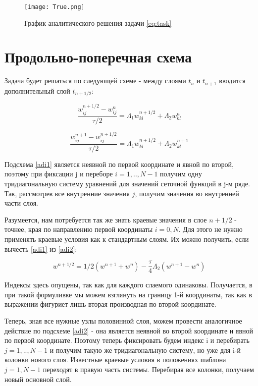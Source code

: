 \begin{figure}[h]
\centering
\texttt{[image: True.png]}
\caption{График аналитического решения задачи \ref{eq:task}}
\end{figure}

\newpage
\section{Продольно-поперечная схема}

Задача будет решаться по следующей схеме - между слоями $t_n$ и $t_{n+1}$  вводится дополнительный слой $t_{n+1/2}$:

\begin{equation}
\frac{w_{ij}^{n+1/2} - w_{ij}^n}{\tau / 2} = \Lambda_1  w_{kl}^{n+1/2} + \Lambda_2  w_{kl}^n
\label{adi1}
\end{equation}

\begin{equation}
\frac{w_{ij}^{n+1} - w_{ij}^{n+1/2}}{\tau / 2} = \Lambda_1  w_{kl}^{n+1/2} + \Lambda_2  w_{kl}^{n+1}
\label{adi2}
\end{equation}

Подсхема \ref{adi1} является неявной по первой координате и явной по второй, поэтому при фиксации j и переборе $i = 1,..,N-1$ получим одну тридиагональную систему уравнений для значений сеточной функций в j-м ряде. 
Так, рассмотрев все внутренние значения $j$, получим значения во внутренней части слоя.

Разумеется, нам потребуется так же знать краевые значения в слое $n+1/2$ - точнее, края по направлению первой координаты $i=0,N$. 
Для этого не нужно применять краевые условия как к стандартным слоям.
Их можно получить, если вычесть \ref{adi1} из \ref{adi2}:

\[ w^{n+1/2} = 1/2 (w^{n+1} + w^{n}) - \frac{\tau}{4} \Lambda_2(w^{n+1} - w^{n}) \]

Индексы здесь опущены, так как для каждого слаемого одинаковы. 
Получается, в при такой формуливке мы можем взглянуть на границу 1-й координаты, так как в выражении фигуриет лишь вторая производная по второй координате. 

Теперь, зная все нужные узлы половинной слоя, можем провести аналогичное действие по подсхеме \ref{adi2} - она является неявной во второй координате и явной по первой координате.
Поэтому теперь фиксировать будем индекс i и перебирать $j = 1,..,N-1$ и получим такую же тридиагональную систему, но уже для i-й колонки нового слоя. Известные краевые условия в положениях шаблона $j=1,N-1$ переходят в правую часть системы. Перебирая все колонки, получаем новый основной слой.

